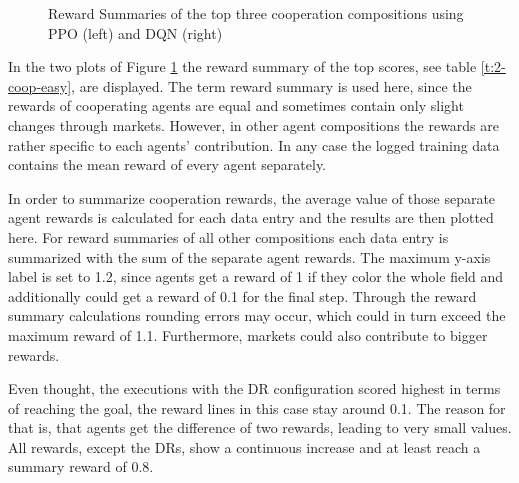 \begin{figure}[hpbt]
    \centering
    \hspace{0.01\textwidth}
    \caption[Reward Summaries of the Top Cooperation Modes]{Reward Summaries of the top three cooperation compositions using PPO (left) and DQN (right)}
    \label{fig:multipic_plots_coop_easy} %
\end{figure}

In the two plots of Figure \ref{fig:multipic_plots_coop_easy} the reward summary of the top scores, see table \ref{t:2-coop-easy}, are displayed. The term reward summary is used here, since the rewards of cooperating agents are equal and sometimes contain only slight changes through markets. However, in other agent compositions the rewards are rather specific to each agents' contribution. In any case the logged training data contains the mean reward of every agent separately. 

In order to summarize cooperation rewards, the average value of those separate agent rewards is calculated for each data entry and the results are then plotted here. For reward summaries of all other compositions each data entry is summarized with the sum of the separate agent rewards. The maximum y-axis label is set to 1.2, since agents get a reward of 1 if they color the whole field and additionally could get a reward of 0.1 for the final step. Through the reward summary calculations rounding errors may occur, which could in turn exceed the maximum reward of 1.1. Furthermore, markets could also contribute to bigger rewards. 

Even thought, the executions with the DR configuration scored highest in terms of reaching the goal, the reward lines in this case stay around 0.1. The reason for that is, that agents get the difference of two rewards, leading to very small values. All rewards, except the DRs, show a continuous increase and at least reach a summary reward of 0.8. 

